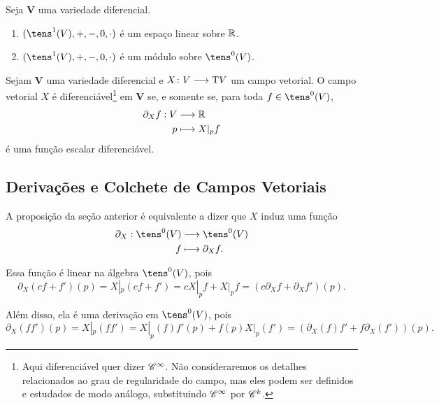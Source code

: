 \begin{prop}
Seja $\bm V$ uma variedade diferencial.
	\begin{enumerate}
	\item $(\tens^1(V),+,-,0,\cdot)$ é um espaço linear sobre $\mathbb{R}$.
	\item $(\tens^1(V),+,-,0,\cdot)$ é um módulo sobre $\tens^0(V)$.
	\end{enumerate}
\end{prop}

\begin{prop}
Sejam $\bm V$ uma variedade diferencial e $X\colon V \longrightarrow \mathrm{T} V$ um campo vetorial. O campo vetorial $X$ é diferenciável\footnote{Aqui diferenciável quer dizer $\mathscr{C}^\infty$. Não consideraremos os detalhes relacionados ao grau de regularidade do campo, mas eles podem ser definidos e estudados de modo análogo, substituindo $\mathscr{C}^\infty$ por $\mathscr{C}^k$.} em $\bm V$ se, e somente se, para toda $f \in \tens^0(V)$,
	\begin{align*}
	{\partial_X f}: {V} &\longrightarrow {\mathbb{R}} \\{p} &\longmapsto {X|_p f}
	\end{align*}
é uma função escalar diferenciável.
\end{prop}

\subsection{Derivações e Colchete de Campos Vetoriais}

A proposição da seção anterior é equivalente a dizer que $X$ induz uma função
	\begin{align*}
	\func{\partial_X}{\tens^0(V)}{\tens^0(V)}{f}{\partial_X f.}
	\end{align*}

Essa função é linear na álgebra $\tens^0(V)$, pois
	\begin{equation*}
	\partial_X(cf+f')(p) = X|_p(cf+f') = cX|_p f + X|_p f = (c\partial_X f + \partial_X f')(p).
	\end{equation*}

Além disso, ela é uma derivação em $\tens^0(V)$, pois
	\begin{equation*}
	\partial_X(ff')(p) = X|_p(ff') = X|_p(f)f'(p) + f(p) X|_p(f') = (\partial_X(f)f'+f\partial_X(f'))(p).
	\end{equation*}

